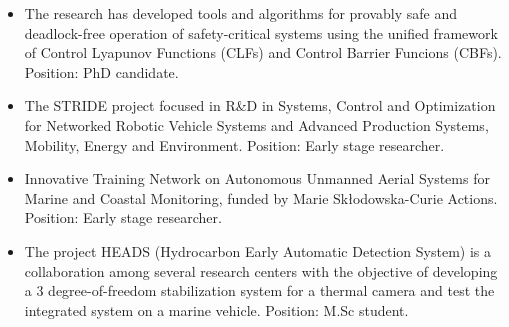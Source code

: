 
\begin{itemize}
\item The research has developed tools and algorithms for provably safe and deadlock-free operation of safety-critical systems 
using the unified framework of Control Lyapunov Functions (CLFs) and Control Barrier Funcions (CBFs). Position: PhD candidate.
\end{itemize}

\newpage

\begin{itemize}
\item The STRIDE project focused in R\&D in Systems, Control and Optimization for Networked Robotic Vehicle Systems and Advanced Production Systems, Mobility, Energy and Environment.
Position: Early stage researcher.
\end{itemize}


\begin{itemize}
\item Innovative Training Network on Autonomous Unmanned Aerial Systems for Marine and Coastal Monitoring, funded by Marie Skłodowska-Curie Actions.
Position: Early stage researcher.
\end{itemize}


\begin{itemize}
\item The project HEADS (Hydrocarbon Early Automatic Detection System) is a collaboration among several research centers with the objective of developing a 3 degree-of-freedom stabilization system for a thermal camera and test the integrated system on a marine vehicle. Position: M.Sc student.
\end{itemize}


